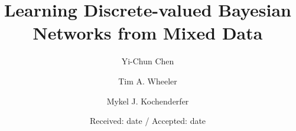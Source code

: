 \newcommand{\paren}[1]{\mathopen{}\mathclose\bgroup\left(#1\aftergroup\egroup\right)}
\newcommand{\brock}[1]{\mathopen{}\mathclose\bgroup\left[#1\aftergroup\egroup\right]}
\newcommand{\curly}[1]{\mathopen{}\mathclose\bgroup\left\{#1\aftergroup\egroup\right\}}
\newcommand{\anglebrackets}[1]{\langle #1 \rangle}
\newcommand{\ceil}[1]{\lceil #1 \rceil}
\newcommand{\floor}[1]{\lfloor #1 \rfloor}

\newcommand{\discset}{\mathcal{M}}

\DeclareMathOperator*{\argmin}{arg\,min}
\DeclareMathOperator*{\argmax}{arg\,max}

\newcommand{\todo}[1]{\textcolor{magenta}{#1}}
\newcommand{\yichun}[1]{\textit{\textcolor{green}{#1}}}
\newcommand{\tim}[1]{\textit{\textcolor{blue}{#1}}}
\newcommand{\mykel}[1]{\textit{\textcolor{cyan}{#1}}}




\title{Learning Discrete-valued Bayesian Networks from Mixed Data%
}


\author{Yi-Chun Chen           \and
        Tim A. Wheeler         \and
        Mykel J. Kochenderfer
}



\date{Received: date / Accepted: date}


\maketitle

